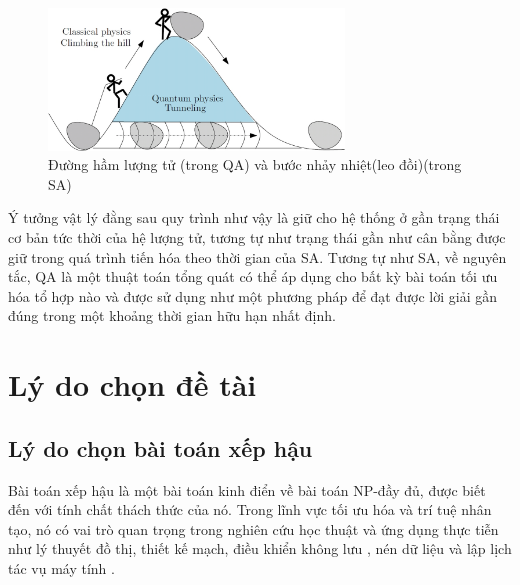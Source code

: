 \begin{figure}[h]
	\centering
	\includegraphics[width=0.7\textwidth]{images/quantum tunneling.png}
	\caption{Đường hầm lượng tử (trong QA) và bước nhảy nhiệt(leo đồi)(trong SA) \cite{Quantum tunneling}}
	\label{fig:quantum_tunneling_and_hill_climbing}
\end{figure}

Ý tưởng vật lý đằng sau quy trình như vậy là giữ cho hệ thống ở gần trạng thái cơ bản tức thời của hệ lượng tử, tương tự như trạng thái gần như cân bằng được giữ trong quá trình tiến hóa theo thời gian của SA. Tương tự như SA, về nguyên tắc, QA là một thuật toán tổng quát có thể áp dụng cho bất kỳ bài toán tối ưu hóa tổ hợp nào và được sử dụng như một phương pháp để đạt được lời giải gần đúng trong một khoảng thời gian hữu hạn nhất định.




\section{Lý do chọn đề tài}
\subsection{Lý do chọn bài toán xếp hậu}


Bài toán xếp hậu là một bài toán kinh điển về bài toán NP-đầy đủ, được biết đến với tính chất thách thức của nó. Trong lĩnh vực tối ưu hóa và trí tuệ nhân tạo, nó có vai trò quan trọng trong nghiên cứu học thuật và ứng dụng thực tiễn như lý thuyết đồ thị, thiết kế mạch, điều khiển không lưu
, nén dữ liệu và lập lịch tác vụ máy tính \cite{A survey of known results and research areas for}. 

